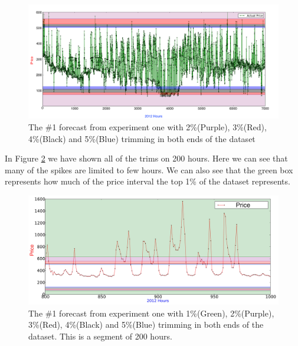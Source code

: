\begin{figure}[H]
\centering
\includegraphics[width=\linewidth]{billeder/PriceExperimentalAnalysis/restOfTrims.png}
\caption{The \#1 forecast from experiment one with 2\%(Purple), 3\%(Red), 4\%(Black) and 5\%(Blue) trimming in both ends of the dataset}
\label{fig:AllTrims}
\end{figure}

In Figure \ref{fig:AllTrims200Hours} we have shown all of the trims on 200 hours. Here we can see that many of the spikes are limited to few hours. We can also see that the green box represents how much of the price interval the top 1\% of the dataset represents.

\begin{figure}[H]
\centering
\includegraphics[width=\linewidth]{billeder/PriceExperimentalAnalysis/200hoursTrimming.jpg}
\caption{The \#1 forecast from experiment one with 1\%(Green), 2\%(Purple), 3\%(Red), 4\%(Black) and 5\%(Blue) trimming in both ends of the dataset. This is a segment of 200 hours.}
\label{fig:AllTrims200Hours}
\end{figure}

